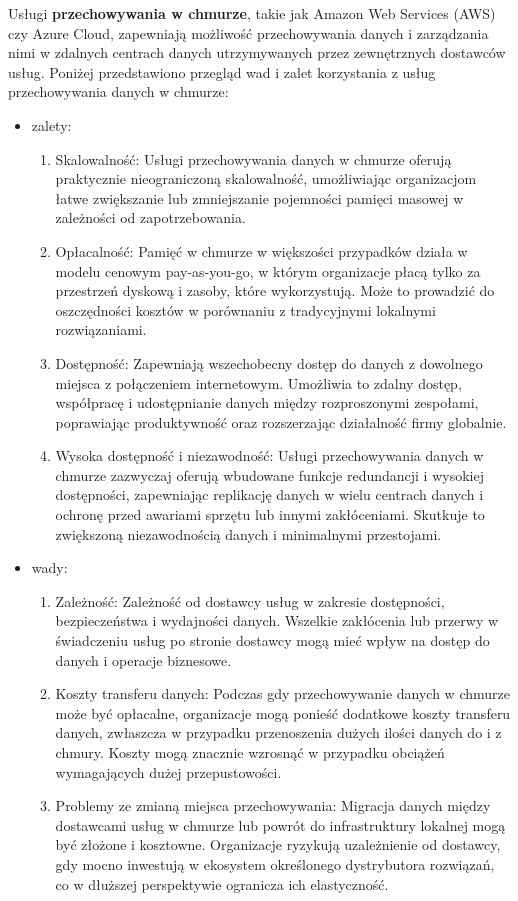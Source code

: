 \documentclass[12pt,a4paper,twoside]{article}
\begin{document}
Usługi \textbf{przechowywania w chmurze}, takie jak Amazon Web Services (AWS) czy Azure Cloud, zapewniają możliwość przechowywania danych i zarządzania nimi w zdalnych centrach danych utrzymywanych przez zewnętrznych dostawców usług. Poniżej przedstawiono przegląd wad i zalet korzystania z usług przechowywania danych w chmurze:
\begin{itemize}
	\item zalety:
		\begin{enumerate}
			\item Skalowalność: Usługi przechowywania danych w chmurze oferują praktycznie nieograniczoną skalowalność, umożliwiając organizacjom łatwe zwiększanie lub zmniejszanie pojemności pamięci masowej w zależności od zapotrzebowania.
			\item Opłacalność: Pamięć w chmurze w większości przypadków działa w modelu cenowym pay-as-you-go, w którym organizacje płacą tylko za przestrzeń dyskową i zasoby, które wykorzystują. Może to prowadzić do oszczędności kosztów w porównaniu z tradycyjnymi lokalnymi rozwiązaniami.
			\item Dostępność: Zapewniają wszechobecny dostęp do danych z dowolnego miejsca z połączeniem internetowym. Umożliwia to zdalny dostęp, współpracę i udostępnianie danych między rozproszonymi zespołami, poprawiając produktywność oraz rozszerzając działalność firmy globalnie.
			\item Wysoka dostępność i niezawodność: Usługi przechowywania danych w chmurze zazwyczaj oferują wbudowane funkcje redundancji i wysokiej dostępności, zapewniając replikację danych w wielu centrach danych i ochronę przed awariami sprzętu lub innymi zakłóceniami. Skutkuje to zwiększoną niezawodnością danych i minimalnymi przestojami.
		\end{enumerate}
	\item wady:
		\begin{enumerate}
			\item Zależność: Zależność od dostawcy usług w zakresie dostępności, bezpieczeństwa i wydajności danych. Wszelkie zakłócenia lub przerwy w świadczeniu usług po stronie dostawcy mogą mieć wpływ na dostęp do danych i operacje biznesowe.
			\item Koszty transferu danych: Podczas gdy przechowywanie danych w chmurze może być opłacalne, organizacje mogą ponieść dodatkowe koszty transferu danych, zwłaszcza w przypadku przenoszenia dużych ilości danych do i z chmury. Koszty mogą znacznie wzrosnąć w przypadku obciążeń wymagających dużej przepustowości.
			\item Problemy ze zmianą miejsca przechowywania: Migracja danych między dostawcami usług w chmurze lub powrót do infrastruktury lokalnej mogą być złożone i kosztowne. Organizacje ryzykują uzależnienie od dostawcy, gdy mocno inwestują w ekosystem określonego dystrybutora rozwiązań, co w dłuższej perspektywie ogranicza ich elastyczność.
		\end{enumerate}
\end{itemize}\par
\end{document}
